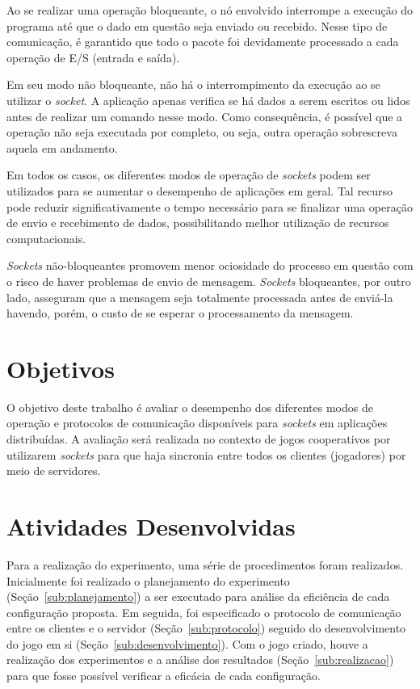 \documentclass[12pt]{article}
\begin{document}
Ao se realizar uma operação bloqueante, o nó envolvido interrompe a execução do
programa até que o dado em questão seja enviado ou recebido. Nesse tipo de
comunicação, é garantido que todo o pacote foi devidamente processado a cada
operação de E/S (entrada e saída).

Em seu modo não bloqueante, não há o interrompimento da execução ao se utilizar
o \emph{socket}. A aplicação apenas verifica se há dados a serem escritos ou
lidos antes de realizar um comando nesse modo. Como consequência, é possível
que a operação não seja executada por completo, ou seja, outra operação
sobrescreva aquela em andamento.

Em todos os casos, os diferentes modos de operação de \emph{sockets} podem ser
utilizados para se aumentar o desempenho de aplicações em geral. Tal recurso
pode reduzir significativamente o tempo necessário para se finalizar uma
operação de envio e recebimento de dados, possibilitando melhor utilização de
recursos computacionais.

\textit{Sockets} não-bloqueantes promovem menor ociosidade do processo em
questão com o risco de haver problemas de envio de mensagem. \textit{Sockets}
bloqueantes, por outro lado, asseguram que a mensagem seja totalmente
processada antes de enviá-la havendo, porém, o custo de se esperar o
processamento da mensagem.


\section{Objetivos} \label{sec:objetivos}

O objetivo deste trabalho é avaliar o desempenho dos diferentes modos de
operação e protocolos de comunicação disponíveis para \emph{sockets} em
aplicações distribuídas. A avaliação será realizada no contexto de jogos
cooperativos por utilizarem \emph{sockets} para que haja sincronia entre todos
os clientes (jogadores) por meio de servidores.

\section{Atividades Desenvolvidas} \label{sec:atividades}

Para a realização do experimento, uma série de procedimentos foram realizados.
Inicialmente foi realizado o planejamento do experimento
(Seção~\ref{sub:planejamento}) a ser executado para análise da eficiência de
cada configuração proposta. Em seguida, foi especificado o protocolo de
comunicação entre os clientes e o servidor (Seção~\ref{sub:protocolo}) seguido
do desenvolvimento do jogo em si (Seção~\ref{sub:desenvolvimento}). Com o jogo
criado, houve a realização dos experimentos e a análise dos resultados
(Seção~\ref{sub:realizacao}) para que fosse possível verificar a eficácia de
cada configuração.
\end{document}
